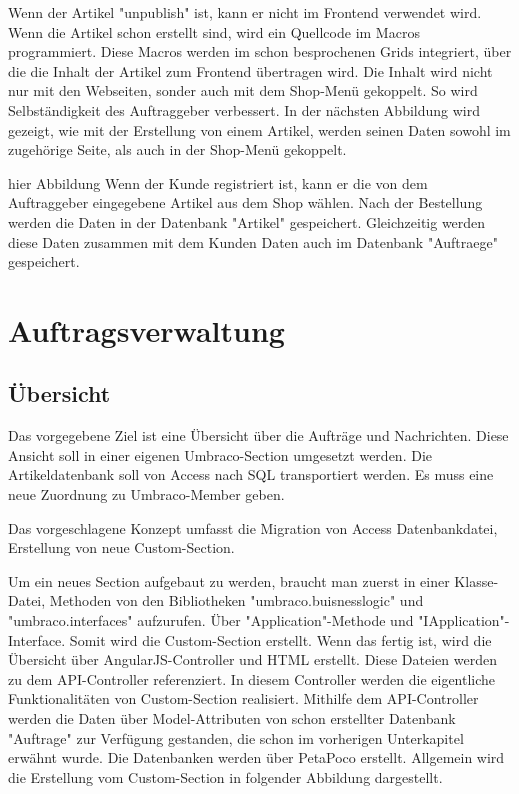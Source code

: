Wenn der Artikel "unpublish" ist, kann er nicht im Frontend verwendet wird. Wenn die Artikel schon erstellt sind, wird ein Quellcode im Macros programmiert. Diese Macros werden im schon besprochenen Grids integriert, über die die Inhalt der Artikel zum Frontend übertragen wird. 
Die Inhalt wird nicht nur mit den Webseiten, sonder auch mit dem Shop-Menü gekoppelt. So wird Selbständigkeit des Auftraggeber verbessert. In der nächsten Abbildung wird gezeigt, wie mit der Erstellung von einem Artikel, werden seinen Daten sowohl im zugehörige Seite, als auch in der Shop-Menü gekoppelt.
 
 hier Abbildung
Wenn der Kunde registriert ist, kann er die von dem Auftraggeber eingegebene Artikel aus dem Shop wählen. Nach der Bestellung werden die Daten in der Datenbank "Artikel" gespeichert. Gleichzeitig werden diese Daten zusammen mit dem Kunden Daten auch im Datenbank "Auftraege" gespeichert. 




\section{Auftragsverwaltung}
\subsection{Übersicht}

Das vorgegebene Ziel ist eine Übersicht über die Aufträge und Nachrichten. Diese Ansicht soll in einer eigenen Umbraco-Section umgesetzt werden. Die Artikeldatenbank soll von Access nach SQL transportiert werden. Es muss eine neue Zuordnung zu Umbraco-Member geben.

Das vorgeschlagene Konzept umfasst die Migration von Access Datenbankdatei, Erstellung von neue Custom-Section. 

Um ein neues Section aufgebaut zu werden, braucht man zuerst in einer Klasse-Datei, Methoden von den Bibliotheken "umbraco.buisnesslogic" und "umbraco.interfaces" aufzurufen. Über "Application"-Methode und "IApplication"-Interface. Somit wird die Custom-Section erstellt. Wenn das fertig ist, wird die Übersicht über AngularJS-Controller und HTML erstellt. Diese Dateien werden zu dem API-Controller referenziert. In diesem Controller werden die eigentliche Funktionalitäten von Custom-Section realisiert. Mithilfe dem API-Controller werden die Daten über Model-Attributen von schon erstellter Datenbank "Auftrage" zur Verfügung gestanden, die schon im vorherigen Unterkapitel erwähnt wurde. Die Datenbanken werden über PetaPoco erstellt. Allgemein wird die Erstellung vom Custom-Section in folgender Abbildung dargestellt.

